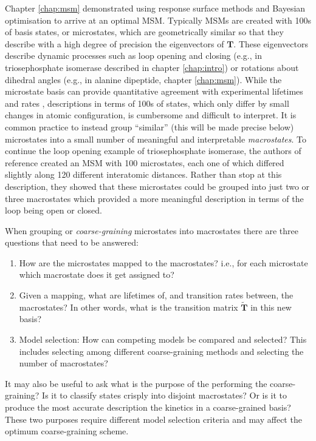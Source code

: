 Chapter \ref{chap:msm} demonstrated using response surface methods and Bayesian optimisation to arrive at an optimal MSM. Typically MSMs are created with \num{100}s of basis states, or microstates, which are geometrically similar so that they describe with a high degree of precision the eigenvectors of $\mathbf{T}$. These eigenvectors describe dynamic processes such as loop opening and closing (e.g., in triosephosphate isomerase \cite{LoopMotionTriosephosphate} described in chapter \ref{chap:intro}) or rotations about dihedral angles  (e.g., in alanine dipeptide, chapter \ref{chap:msm}). While the microstate basis can provide quantitative agreement with experimental lifetimes and rates \cite{bowmanNetworkModelsMolecular2010},  descriptions in terms of \num{100}s of states, which only differ by small changes in atomic configuration, is cumbersome and difficult to interpret.  It is common practice to instead group ``similar'' (this will be made precise below) microstates into a small number of meaningful and interpretable \emph{macrostates}.  To continue the loop opening example of triosephosphate isomerase, the authors of reference \cite{LoopMotionTriosephosphate} created an MSM with 100 microstates, each one of which differed slightly along 120 different interatomic distances.  Rather than stop at this description, they showed that these microstates could be grouped into just two or three macrostates which provided a more meaningful description in terms of the loop being open or closed. 

When grouping or \emph{coarse-graining} microstates into macrostates there are three questions that need to be answered: 

\begin{enumerate}
    \item How are the microstates mapped to the macrostates?  i.e., for each microstate which macrostate does it get assigned to?  
    \item Given a mapping, what are lifetimes of, and transition rates between, the macrostates? In other words, what is the transition matrix $\widetilde{\mathbf{T}}$ in this new basis?
    \item Model selection: How can competing models be compared and selected? This includes selecting among different coarse-graining methods and selecting the number of macrostates? 

\end{enumerate}
It may also be useful to ask what is the purpose of the performing the coarse-graining?  Is it to classify states crisply into disjoint macrostates? Or is it to produce the most accurate description the kinetics in a coarse-grained basis?  These two purposes require different model selection criteria and may affect the optimum coarse-graining scheme.

